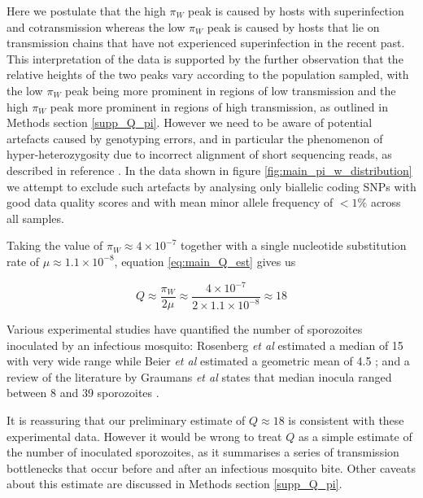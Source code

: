 \documentclass[_main.tex]{subfiles}
\begin{document}
Here we postulate that the high $\pi_W$ peak is caused by hosts with superinfection and cotransmission whereas the low $\pi_W$ peak is caused by hosts that lie on transmission chains that have not experienced superinfection in the recent past.  This interpretation of the data is supported by the further observation that the relative heights of the two peaks vary according to the population sampled, with the low $\pi_W$ peak being more prominent in regions of low transmission and the high $\pi_W$ peak more prominent in regions of high transmission, as outlined in Methods section \ref{supp_Q_pi}.  However we need to be aware of potential artefacts caused by genotyping errors, and in particular the phenomenon of hyper-heterozygosity due to incorrect alignment of short sequencing reads, as described in reference \cite{Manske2012}.  In the data shown in figure \ref{fig:main_pi_w_distribution} we attempt to exclude such artefacts by analysing only biallelic coding SNPs with good data quality scores and with mean minor allele frequency of $<1\%$ across all samples.

Taking the value of $\pi_W \approx 4 \times 10^{-7}$ together with a single nucleotide substitution rate of $\mu \approx 1.1 \times 10^{-8}$, equation \ref{eq:main_Q_est} gives us 

\begin{equation}
Q 
\approx \frac{ \pi_W }{ 2 \mu }
\approx \frac{ 4 \times 10^{-7}}{ 2 \times 1.1 \times 10^{-8}}
\approx 18
\label{eq:main_Q_sums}
\end{equation}

Various experimental studies have quantified the number of sporozoites inoculated by an infectious mosquito: Rosenberg \textit{et al} estimated a median of 15 with very wide range \cite{Rosenberg1990} while Beier \textit{et al} estimated a geometric mean of 4.5 \cite{Beier1991}; and a review of the literature by Graumans \textit{et al} states that median inocula ranged between 8 and 39 sporozoites \cite{Graumans2020}.   

It is reassuring that our preliminary estimate of $Q \approx 18$ is consistent with these experimental data.  However it would be wrong to treat $Q$ as a simple estimate of the number of inoculated sporozoites, as it summarises a series of transmission bottlenecks that occur before and after an infectious mosquito bite.  Other caveats about this estimate are discussed in Methods section \ref{supp_Q_pi}.


\end{document}
